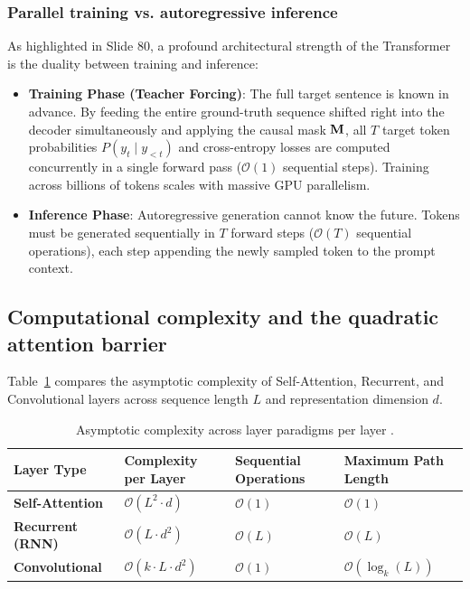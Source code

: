 \documentclass[../../../main.tex]{subfiles}
\begin{document}
\subsubsection{Parallel training vs. autoregressive inference}
As highlighted in Slide 80, a profound architectural strength of the Transformer is the duality between training and inference:
\begin{itemize}
    \item \textbf{Training Phase (Teacher Forcing)}: The full target sentence is known in advance. By feeding the entire ground-truth sequence shifted right into the decoder simultaneously and applying the causal mask $\mathbf{M}$, all $T$ target token probabilities $P(y_t \mid y_{<t})$ and cross-entropy losses are computed concurrently in a single forward pass ($\mathcal{O}(1)$ sequential steps). Training across billions of tokens scales with massive GPU parallelism.
    \item \textbf{Inference Phase}: Autoregressive generation cannot know the future. Tokens must be generated sequentially in $T$ forward steps ($\mathcal{O}(T)$ sequential operations), each step appending the newly sampled token to the prompt context.
\end{itemize}

\subsection{Computational complexity and the quadratic attention barrier}
\label{subsec:computational_complexity_ch5}

Table~\ref{tab:layer_complexity_comparison_ch5} compares the asymptotic complexity of Self-Attention, Recurrent, and Convolutional layers across sequence length $L$ and representation dimension $d$.

\begin{table}[htbp]
\centering
\small
\caption{Asymptotic complexity across layer paradigms per layer \cite{vaswani2017}.}
\label{tab:layer_complexity_comparison_ch5}
\begin{tabularx}{\textwidth}{lXXX}
\toprule
\textbf{Layer Type} & \textbf{Complexity per Layer} & \textbf{Sequential Operations} & \textbf{Maximum Path Length} \\
\midrule
\textbf{Self-Attention} & $\mathcal{O}(L^2 \cdot d)$ & $\mathcal{O}(1)$ & $\mathcal{O}(1)$ \\
\textbf{Recurrent (RNN)} & $\mathcal{O}(L \cdot d^2)$ & $\mathcal{O}(L)$ & $\mathcal{O}(L)$ \\
\textbf{Convolutional} & $\mathcal{O}(k \cdot L \cdot d^2)$ & $\mathcal{O}(1)$ & $\mathcal{O}(\log_k(L))$ \\
\bottomrule
\end{tabularx}
\end{table}
\end{document}
